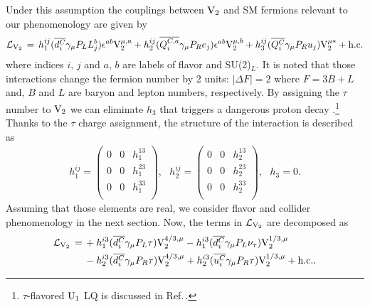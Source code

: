 \documentclass[12pt, a4paper]{article}
\numberwithin{equation}{section} %
\newcommand{\ov}{\overline}
\newcommand{\1}{\mbox{1}\hspace{-0.25em}\mbox{l}}
\begin{document}
Under this assumption the couplings between $\rm{V}_2$ and SM fermions relevant to our phenomenology are given by
\begin{align}
{\cal{L}}_{\rm{V}_2}\,=\,h_{1}^{ij}(\ov{d^{C}_i}\gamma_\mu  P_L L^{b}_j)\epsilon^{ab}{\rm{V}}_2^{\mu,a}
+h_{2}^{ij}(\ov{Q^{C,a}_i}\gamma_\mu  P_R e_j)\epsilon^{ab}{\rm{V}}_2^{\mu,b}
+h_3^{ij}(\ov{Q^{C}_i}\gamma_\mu P_R u_j){\rm{V}}_2^{\mu *}+\rm{h.c.}\nonumber\\
\end{align}
where indices $i,\,j$ and $a,\,b$ are labels of flavor and SU(2)$_L$.
It is noted that those interactions change the fermion number by 2 units: $|\Delta F|=2$ where $F=3B+L$ and, $B$ and $L$ are baryon and lepton numbers, respectively. 
By assigning the $\tau$ number to $\rm{V}_2$ we can eliminate $h_3$ that triggers a dangerous proton decay \cite{Frampton:1989fu,Frampton:1990hz,Frampton:1991ay}.\footnote{$\tau$-flavored $\rm{U}_1$ LQ is discussed in Ref.\,\cite{Bernigaud:2021fwn}.}
Thanks to the $\tau$ charge assignment, the structure of the interaction is described as 
 \begin{eqnarray}
  h_1^{ij} =\left(
  \begin{array}{ccc}
    0 &0 &h_1^{13}\\
    0 &0&h_1^{23}\\
    0 &0 &h_1^{33}\\
  \end{array}
  \right),~~~h_2^{ij} =\left(
  \begin{array}{ccc}
    0 &0&h_2^{13}\\
    0 &0&h_2^{23}\\
    0 &0&h_2^{33}\\
  \end{array}
  \right),~~~ h_3=0.
\label{eq:coupling_structure}
\end{eqnarray}
Assuming that those elements are real, we consider flavor and collider phenomenology in the next section. Now, the terms in ${\cal{L}}_{\rm{V}_2}$ are decomposed as  
\begin{align}
{{\cal{L}}_{\rm{V}_2}}\,=\,&+h_{1}^{i3}(\ov{d^{C}_i}\gamma_\mu P_L \tau){\rm{V}}_2^{4/3,\mu}
-h_{1}^{i3}(\ov{d^{C}_i}\gamma_\mu  P_L \nu_{\tau}){{{\rm{V}}_2^{1/3,\mu}}}\nonumber\\
&-h_{2}^{i3}(\ov{d^{C}_i}\gamma_\mu  P_R \tau){\rm{V}_2^{4/3,\mu}}
+h_{2}^{i3}(\ov{u^{C}_i}\gamma_\mu  P_R \tau){\rm{V}_2^{1/3,\mu}}+\rm{h.c.}.
\label{Eq:fermoin_VQ}
\end{align}
\end{document}
